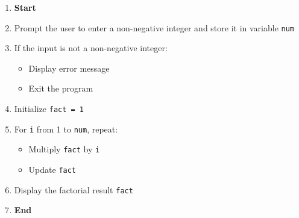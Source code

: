 \begin{enumerate}
    \item \textbf{Start}
    \item Prompt the user to enter a non-negative integer and store it in variable \texttt{num}
    \item If the input is not a non-negative integer:
    \begin{itemize}
        \item Display error message
        \item Exit the program
    \end{itemize}
    \item Initialize \texttt{fact = 1}
    \item For \texttt{i} from 1 to \texttt{num}, repeat:
    \begin{itemize}
        \item Multiply \texttt{fact} by \texttt{i}
        \item Update \texttt{fact}
    \end{itemize}
    \item Display the factorial result \texttt{fact}
    \item \textbf{End}
\end{enumerate}

